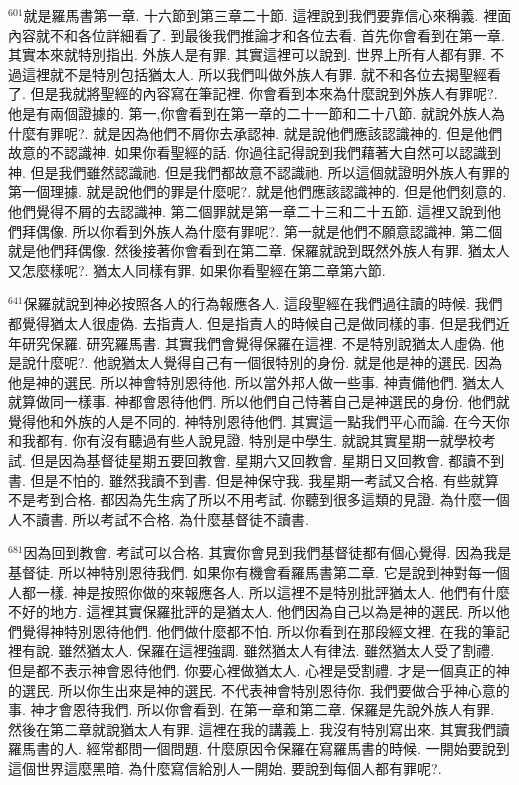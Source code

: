 \documentclass{book}
\begin{document}
$^{601}$就是羅馬書第一章.
十六節到第三章二十節.
這裡說到我們要靠信心來稱義.
裡面內容就不和各位詳細看了.
到最後我們推論才和各位去看.
首先你會看到在第一章.
其實本來就特別指出.
外族人是有罪.
其實這裡可以說到.
世界上所有人都有罪.
不過這裡就不是特別包括猶太人.
所以我們叫做外族人有罪.
就不和各位去揭聖經看了.
但是我就將聖經的內容寫在筆記裡.
你會看到本來為什麼說到外族人有罪呢?.
他是有兩個證據的.
第一,你會看到在第一章的二十一節和二十八節.
就說外族人為什麼有罪呢?.
就是因為他們不屑你去承認神.
就是說他們應該認識神的.
但是他們故意的不認識神.
如果你看聖經的話.
你過往記得說到我們藉著大自然可以認識到神.
但是我們雖然認識祂.
但是我們都故意不認識祂.
所以這個就證明外族人有罪的第一個理據.
就是說他們的罪是什麼呢?.
就是他們應該認識神的.
但是他們刻意的.
他們覺得不屑的去認識神.
第二個罪就是第一章二十三和二十五節.
這裡又說到他們拜偶像.
所以你看到外族人為什麼有罪呢?.
第一就是他們不願意認識神.
第二個就是他們拜偶像.
然後接著你會看到在第二章.
保羅就說到既然外族人有罪.
猶太人又怎麼樣呢?.
猶太人同樣有罪.
如果你看聖經在第二章第六節.

$^{641}$保羅就說到神必按照各人的行為報應各人.
這段聖經在我們過往讀的時候.
我們都覺得猶太人很虛偽.
去指責人.
但是指責人的時候自己是做同樣的事.
但是我們近年研究保羅.
研究羅馬書.
其實我們會覺得保羅在這裡.
不是特別說猶太人虛偽.
他是說什麼呢?.
他說猶太人覺得自己有一個很特別的身份.
就是他是神的選民.
因為他是神的選民.
所以神會特別恩待他.
所以當外邦人做一些事.
神責備他們.
猶太人就算做同一樣事.
神都會恩待他們.
所以他們自己恃著自己是神選民的身份.
他們就覺得他和外族的人是不同的.
神特別恩待他們.
其實這一點我們平心而論.
在今天你和我都有.
你有沒有聽過有些人說見證.
特別是中學生.
就說其實星期一就學校考試.
但是因為基督徒星期五要回教會.
星期六又回教會.
星期日又回教會.
都讀不到書.
但是不怕的.
雖然我讀不到書.
但是神保守我.
我星期一考試又合格.
有些就算不是考到合格.
都因為先生病了所以不用考試.
你聽到很多這類的見證.
為什麼一個人不讀書.
所以考試不合格.
為什麼基督徒不讀書.

$^{681}$因為回到教會.
考試可以合格.
其實你會見到我們基督徒都有個心覺得.
因為我是基督徒.
所以神特別恩待我們.
如果你有機會看羅馬書第二章.
它是說到神對每一個人都一樣.
神是按照你做的來報應各人.
所以這裡不是特別批評猶太人.
他們有什麼不好的地方.
這裡其實保羅批評的是猶太人.
他們因為自己以為是神的選民.
所以他們覺得神特別恩待他們.
他們做什麼都不怕.
所以你看到在那段經文裡.
在我的筆記裡有說.
雖然猶太人.
保羅在這裡強調.
雖然猶太人有律法.
雖然猶太人受了割禮.
但是都不表示神會恩待他們.
你要心裡做猶太人.
心裡是受割禮.
才是一個真正的神的選民.
所以你生出來是神的選民.
不代表神會特別恩待你.
我們要做合乎神心意的事.
神才會恩待我們.
所以你會看到.
在第一章和第二章.
保羅是先說外族人有罪.
然後在第二章就說猶太人有罪.
這裡在我的講義上.
我沒有特別寫出來.
其實我們讀羅馬書的人.
經常都問一個問題.
什麼原因令保羅在寫羅馬書的時候.
一開始要說到這個世界這麼黑暗.
為什麼寫信給別人一開始.
要說到每個人都有罪呢?.
\end{document}
